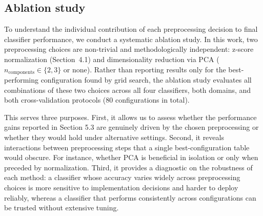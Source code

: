 \subsection{Ablation study}
 
To understand the individual contribution of each preprocessing decision to final classifier performance, we conduct a systematic ablation study. In this work, two preprocessing choices are non-trivial and methodologically independent: z-score normalization (Section~4.1) and dimensionality reduction via PCA ($n_{\text{components}} \in \{2, 3\}$ or none). Rather than reporting results only for the best-performing configuration found by grid search, the ablation study evaluates all combinations of these two choices across all four classifiers, both domains, and both cross-validation protocols (80 configurations in total).

This serves three purposes. First, it allows us to assess whether the performance gains reported in Section 5.3 are genuinely driven by the chosen preprocessing or whether they would hold under alternative settings. Second, it reveals interactions between preprocessing steps that a single best-configuration table would obscure. For instance, whether PCA is beneficial in isolation or only when preceded by normalization. Third, it provides a diagnostic on the robustness of each method: a classifier whose accuracy varies widely across preprocessing choices is more sensitive to implementation decisions and harder to deploy reliably, whereas a classifier that performs consistently across configurations can be trusted without extensive tuning.


